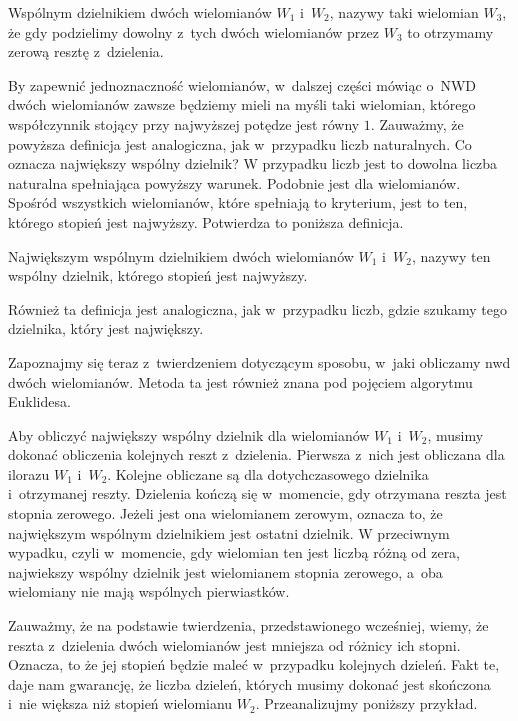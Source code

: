 \begin{definition}
	$ $\\
	Wspólnym dzielnikiem dwóch wielomianów $W_1$ i~$W_2$, nazywy taki wielomian $W_3$, że gdy podzielimy dowolny z~tych dwóch wielomianów przez $W_3$ to otrzymamy zerową resztę z~dzielenia.
\end{definition}

By zapewnić jednoznaczność wielomianów, w~dalszej części mówiąc o~NWD dwóch wielomianów zawsze będziemy mieli na myśli taki wielomian, którego współczynnik stojący przy najwyższej potędze jest równy $1$. Zauważmy, że powyższa definicja jest analogiczna, jak w~przypadku liczb naturalnych.
Co oznacza największy wspólny dzielnik? W przypadku liczb jest to dowolna liczba naturalna spełniająca powyższy warunek. Podobnie jest dla wielomianów. Spośród wszystkich wielomianów, które spełniają to kryterium, jest to ten, którego stopień jest najwyższy. Potwierdza to poniższa definicja.

\begin{definition}
	$ $\\
	Największym wspólnym dzielnikiem dwóch wielomianów $W_1$ i~$W_2$, nazywy ten wspólny dzielnik, którego stopień jest najwyższy.
\end{definition}

Również ta definicja jest analogiczna, jak w~przypadku liczb, gdzie szukamy tego dzielnika, który jest największy.

Zapoznajmy się teraz z~twierdzeniem dotyczącym sposobu, w~jaki obliczamy nwd dwóch wielomianów. Metoda ta jest również znana pod pojęciem algorytmu Euklidesa.

\begin{theorem}
	$ $\\
	Aby obliczyć największy wspólny dzielnik dla wielomianów $W_1$ i~$W_2$, musimy dokonać obliczenia kolejnych reszt z~dzielenia. Pierwsza z~nich jest obliczana dla ilorazu $W_1$ i~$W_2$. Kolejne obliczane są dla dotychczasowego dzielnika i~otrzymanej reszty. Dzielenia kończą się w~momencie, gdy otrzymana reszta jest stopnia zerowego. Jeżeli jest ona wielomianem zerowym, oznacza to, że największym wspólnym dzielnikiem jest ostatni dzielnik. W przeciwnym wypadku, czyli w~momencie, gdy wielomian ten jest liczbą różną od zera, najwiekszy wspólny dzielnik jest wielomianem stopnia zerowego, a~oba wielomiany nie mają wspólnych pierwiastków. 
\end{theorem}

Zauważmy, że na podstawie twierdzenia, przedstawionego wcześniej, wiemy, że reszta z~dzielenia dwóch wielomianów jest mniejsza od różnicy ich stopni. Oznacza, to że jej stopień będzie maleć w~przypadku kolejnych dzieleń. Fakt te, daje nam gwarancję, że liczba dzieleń, których musimy dokonać jest skończona i~nie większa niż stopień wielomianu $W_2$. Przeanalizujmy poniższy przykład.

